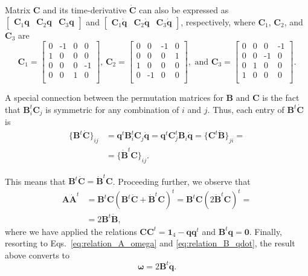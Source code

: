 \documentclass[aip,jcp,reprint,amsmath,amssymb,raggedbottom]{revtex4-1}
\newcommand{\mt}[1]{\boldsymbol{\mathbf{#1}}}           %
\newcommand{\vt}[1]{\boldsymbol{\mathbf{#1}}}           %
\newcommand{\tr}[1]{#1^t}                               %
\begin{document}
Matrix $\mt C$ and its time-derivative $\dot{\mt C}$ can also be expressed as $[\begin{array}{ccc}{\mt C}_1{\vt q} & {\mt C}_2{\vt q} & {\mt C}_3{\vt q}\end{array}]$ and $[\begin{array}{ccc}{\mt C}_1\dot{\vt q} & {\mt C}_2\dot{\vt q} & {\mt C}_3\dot{\vt q}\end{array}]$, respectively, where $\mt C_1$, $\mt C_2$, and $\mt C_3$ are
\[
{\mt C}_1 = \left[ \begin{smallmatrix}
 0 & \text{-}1 &  0 &  0 \\
 1 &  0 &  0 &  0 \\
 0 &  0 &  0 & \text{-}1 \\
 0 &  0 &  1 &  0 \\
\end{smallmatrix} \right], \,
{\mt C}_2 = \left[ \begin{smallmatrix}
 0 &  0 & \text{-}1 &  0 \\
 0 &  0 &  0 &  1 \\
 1 &  0 &  0 &  0 \\
 0 & \text{-}1 &  0 &  0 \\
\end{smallmatrix} \right], \text{ and }
{\mt C}_3 = \left[ \begin{smallmatrix}
 0 &  0 &  0 & \text{-}1 \\
 0 &  0 & \text{-}1 &  0 \\
 0 &  1 &  0 &  0 \\
 1 &  0 &  0 &  0 \\
\end{smallmatrix} \right].
\]

A special connection between the permutation matrices for $\mt B$ and $\mt C$ is the fact that $\tr{\mt B_i}{\mt C_j}$ is symmetric for any combination of $i$ and $j$. Thus, each entry of $\tr{\mt B}\dot{\mt C}$ is
\begin{align*}
\{\tr{\mt B}\dot{\mt C}\}_{ij} &= \tr{\vt q}\tr{\mt B}_i{\mt C}_j\dot{\vt q} = \tr{\vt q}\tr{\mt C}_j{\mt B}_i\dot{\vt q} = \{\tr{\mt C}\dot{\mt B}\}_{ji} = \\
&= \{\tr{\dot{\mt B}}\mt C\}_{ij}.
\end{align*}

This means that $\tr{\mt B}\dot{\mt C} = \tr{\dot{\mt B}}{\mt C}$. Proceeding further, we observe that
\begin{align*}
\mt A \tr{\dot{\mt A}} &= \tr{\mt B}\mt C \tr{(\tr{{\mt B}}\dot{\mt C} + \tr{\dot{\mt B}}{\mt C})} = \tr{\mt B}\mt C \tr{(2 \tr{\dot{\mt B}}{\mt C})} = \\
&= 2 \tr{\mt B}\dot{\mt B},
\end{align*}
where we have applied the relations $\mt C \tr{\mt C} = \mt 1_4 - \vt q\tr{\vt q}$ and $\tr{\vt B}\vt q = \vt 0$. Finally, resorting to Eqs.~\ref{eq:relation_A_omega} and \ref{eq:relation_B_qdot}, the result above converts to
\begin{equation}
\vt \omega = 2\tr{\mt B}\dot{\vt q}.
\end{equation}
\end{document}
